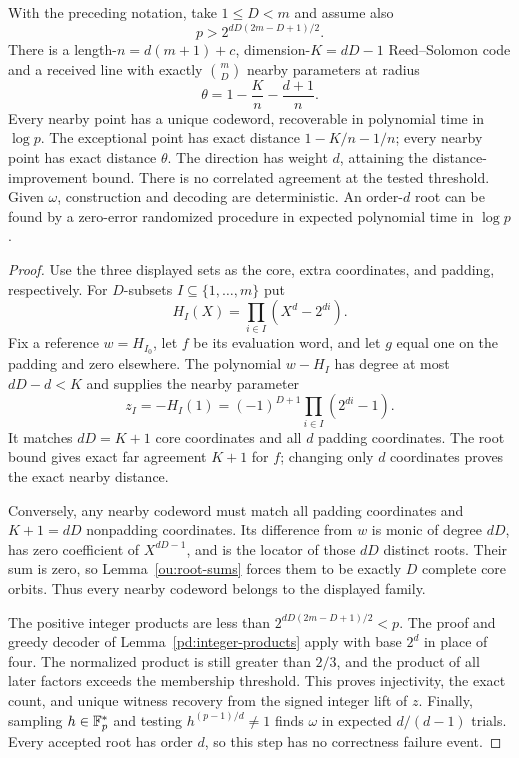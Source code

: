 \begin{theorem}
\label{ou:finite}
With the preceding notation, take $1\le D<m$ and assume also
\[
 p>2^{dD(2m-D+1)/2}.
\]
There is a length-$n=d(m+1)+c$, dimension-$K=dD-1$ Reed--Solomon
code and a received line with exactly $\binom mD$ nearby parameters
at radius
\[
 \theta=1-\frac Kn-\frac{d+1}{n}.
\]
Every nearby point has a unique codeword, recoverable in polynomial
time in $\log p$. The exceptional point has exact distance
$1-K/n-1/n$; every nearby point has exact distance $\theta$.
The direction has weight $d$, attaining the distance-improvement bound.
There is no correlated agreement at the tested threshold.
Given $\omega$, construction and decoding are deterministic. An order-$d$
root can be found by a zero-error randomized procedure in expected
polynomial time in $\log p$.
\end{theorem}
\begin{proof}
Use the three displayed sets as the core, extra coordinates, and padding,
respectively. For $D$-subsets $I\subseteq\{1,\ldots,m\}$ put
\[
 H_I(X)=\prod_{i\in I}(X^d-2^{di}).
\]
Fix a reference $w=H_{I_0}$, let $f$ be its evaluation word, and let $g$
equal one on the padding and zero elsewhere. The polynomial $w-H_I$
has degree at most $dD-d<K$ and supplies the nearby parameter
\[
 z_I=-H_I(1)=(-1)^{D+1}\prod_{i\in I}(2^{di}-1).
\]
It matches $dD=K+1$ core coordinates and all $d$ padding coordinates.
The root bound gives exact far agreement $K+1$ for $f$; changing only
$d$ coordinates proves the exact nearby distance.

Conversely, any nearby codeword must match all padding coordinates
and $K+1=dD$ nonpadding coordinates. Its difference from $w$ is monic
of degree $dD$, has zero coefficient of $X^{dD-1}$, and is the locator
of those $dD$ distinct roots. Their sum is zero, so
Lemma~\ref{ou:root-sums} forces them to be exactly $D$ complete core
orbits. Thus every nearby codeword belongs to the displayed family.

The positive integer products are less than
$2^{dD(2m-D+1)/2}<p$. The proof and greedy decoder of
Lemma~\ref{pd:integer-products} apply with base $2^d$ in place of four.
The normalized product is still greater than $2/3$, and the product of
all later factors exceeds the membership threshold. This proves
injectivity, the exact count, and unique witness recovery from the
signed integer lift of $z$.
Finally, sampling $h\in\mathbb F_p^*$ and testing
$h^{(p-1)/d}\ne1$ finds $\omega$ in expected $d/(d-1)$ trials.
Every accepted root has order $d$, so this step has no correctness
failure event.
\end{proof}

